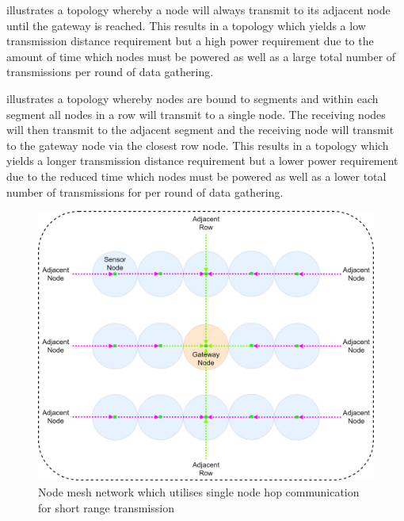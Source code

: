\documentclass[10pt,twocolumn]{witseiepaper}
\begin{document}
			 illustrates a topology whereby a node will always transmit to its adjacent node until the gateway is reached. This results in a topology which yields a low transmission distance requirement but a high power requirement due to the amount of time which nodes must be powered as well as a large total number of transmissions per round of data gathering. 
			
			 illustrates a topology whereby nodes are bound to segments and within each segment all nodes in a row will transmit to a single node. The receiving nodes will then transmit to the adjacent segment and the receiving node will transmit to the gateway node via the closest row node. This results in a topology which yields a longer transmission distance requirement but a lower power requirement due to the reduced time which nodes must be powered as well as a lower total number of transmissions for per round of data gathering.
			
			\begin{figure}
				\centering
				\includegraphics[width=1\columnwidth]{media/hop-mesh.png}
				\vspace{1em}
				\caption{Node mesh network which utilises single node hop communication for short range transmission}
				\raggedright
				\label{fig:single}
			\end{figure}
		
\end{document}
